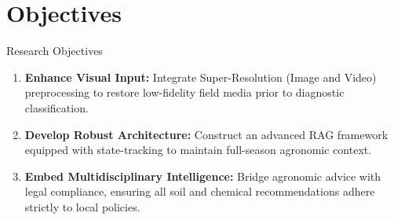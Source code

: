 \documentclass{beamer}
\begin{document}
\section{Objectives}
\begin{frame}{Research Objectives}

	\footnotesize
	\begin{enumerate}
		\item \textbf{Enhance Visual Input:} Integrate Super-Resolution (Image and Video) preprocessing to restore low-fidelity field media prior to diagnostic classification.
		
		\medskip
		\item \textbf{Develop Robust Architecture:} Construct an advanced RAG framework equipped with state-tracking to maintain full-season agronomic context.
		
		\medskip
		\item \textbf{Embed Multidisciplinary Intelligence:} Bridge agronomic advice with legal compliance, ensuring all soil and chemical recommendations adhere strictly to local policies.
	\end{enumerate}
\end{frame}
\end{document}
